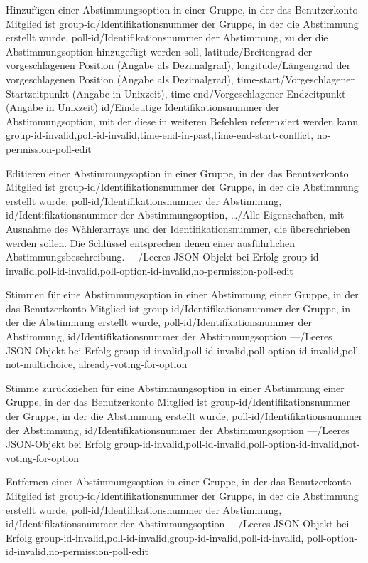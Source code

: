 \documentclass[parskip=full,11pt]{scrartcl}
\begin{document}
{Hinzufügen einer Abstimmungsoption in einer Gruppe, in der das Benutzerkonto
Mitglied ist}
{group-id/Identifikationsnummer der Gruppe{,} in der die Abstimmung erstellt
wurde,
poll-id/Identifikationsnummer der Abstimmung{,} zu der die Abstimmungsoption
hinzugefügt werden soll,
latitude/Breitengrad der vorgeschlagenen Position (Angabe als Dezimalgrad),
longitude/Längengrad der vorgeschlagenen Position (Angabe als Dezimalgrad),
time-start/Vorgeschlagener Startzeitpunkt (Angabe in Unixzeit),
time-end/Vorgeschlagener Endzeitpunkt (Angabe in Unixzeit)}
{id/Eindeutige Identifikationsnummer der Abstimmungsoption{,} mit der diese in
weiteren Befehlen referenziert werden kann}
{group-id-invalid,poll-id-invalid,time-end-in-past,time-end-start-conflict,
no-permission-poll-edit}

{Editieren einer Abstimmungsoption in einer Gruppe, in der das Benutzerkonto
Mitglied ist}
{group-id/Identifikationsnummer der Gruppe{,} in der die Abstimmung erstellt
wurde,
poll-id/Identifikationsnummer der Abstimmung,
id/Identifikationsnummer der Abstimmungsoption,
\dots/Alle Eigenschaften{,} mit Ausnahme des Wählerarrays und der
Identifikationsnummer{,} die überschrieben werden sollen.
Die Schlüssel entsprechen denen einer ausführlichen Abstimmungsbeschreibung.}
{---/Leeres JSON-Objekt bei Erfolg}
{group-id-invalid,poll-id-invalid,poll-option-id-invalid,no-permission-poll-edit}

{Stimmen für eine Abstimmungsoption in einer Abstimmung einer Gruppe,
in der das Benutzerkonto Mitglied ist}
{group-id/Identifikationsnummer der Gruppe{,} in der die Abstimmung erstellt
wurde,
poll-id/Identifikationsnummer der Abstimmung,
id/Identifikationsnummer der Abstimmungsoption}
{---/Leeres JSON-Objekt bei Erfolg}
{group-id-invalid,poll-id-invalid,poll-option-id-invalid,poll-not-multichoice,
already-voting-for-option}

{Stimme zurückziehen für eine Abstimmungsoption in einer Abstimmung
einer Gruppe, in der das Benutzerkonto Mitglied ist}
{group-id/Identifikationsnummer der Gruppe{,} in der die Abstimmung erstellt
wurde,
poll-id/Identifikationsnummer der Abstimmung,
id/Identifikationsnummer der Abstimmungsoption}
{---/Leeres JSON-Objekt bei Erfolg}
{group-id-invalid,poll-id-invalid,poll-option-id-invalid,not-voting-for-option}

{Entfernen einer Abstimmungsoption in einer Gruppe, in der das Benutzerkonto
Mitglied ist}
{group-id/Identifikationsnummer der Gruppe{,} in der die Abstimmung erstellt
wurde,
poll-id/Identifikationsnummer der Abstimmung,
id/Identifikationsnummer der Abstimmungsoption}
{---/Leeres JSON-Objekt bei Erfolg}
{group-id-invalid,poll-id-invalid,group-id-invalid,poll-id-invalid,
poll-option-id-invalid,no-permission-poll-edit}
\end{document}
